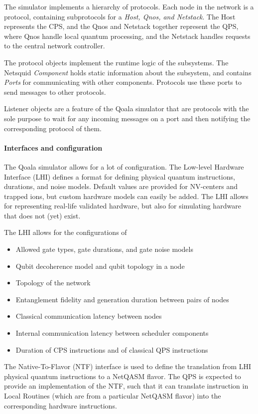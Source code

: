 The simulator implements a hierarchy of protocols. 
Each node in the network is a protocol, containing subprotocols for a \textit{Host, Qnos, and Netstack}. The Host represents the CPS, and the Qnos and Netstack together represent the QPS, where Qnos handle local quantum processing, and the Netstack handles requests to the central network controller. 

The protocol objects implement the runtime logic of the subsystems.
The Netsquid \textit{Component} holds static information about the subsystem, and contains \textit{Ports} for communicating with other components. Protocols use these ports to send messages to other protocols. 

Listener objects are a feature of the Qoala simulator that are protocols with the sole purpose to wait for any incoming messages on a port and then notifying the corresponding protocol of them.

\paragraph{Interfaces and configuration}
The Qoala simulator allows for a lot of configuration.
The Low-level Hardware Interface (LHI) defines a format for defining physical quantum instructions, durations, and noise models.
Default values are provided for NV-centers and trapped ions, but custom hardware models can easily be added.
The LHI allows for representing real-life validated hardware, but also for simulating hardware that does not (yet) exist.

The LHI allows for the configurations of
\begin{itemize}
    \item Allowed gate types, gate durations, and gate noise models
    \item Qubit decoherence model and qubit topology in a node
    \item Topology of the network
    \item Entanglement fidelity and generation duration between pairs of nodes
    \item Classical communication latency between nodes
    \item Internal communication latency between scheduler components
    \item Duration of CPS instructions and of classical QPS instructions
\end{itemize}

The Native-To-Flavor (NTF) interface is used to define the translation from LHI physical quantum instructions to a NetQASM flavor.
The QPS is expected to provide an implementation of the NTF, such that it can translate instruction in Local Routines (which are from a particular NetQASM flavor) into the corresponding hardware instructions.

